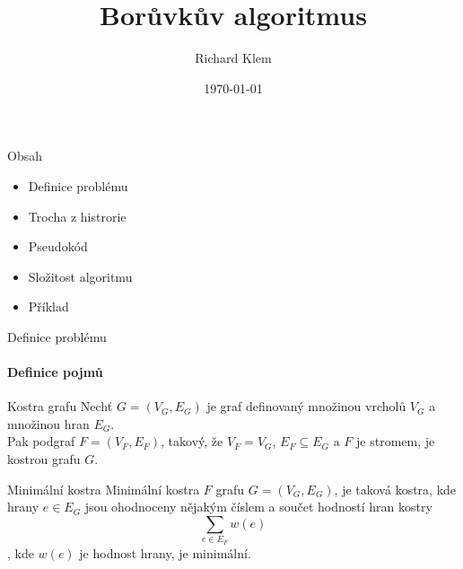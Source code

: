 \documentclass[hyperref={unicode}]{beamer}
\title{Borůvkův algoritmus}
\author{Richard Klem}
\date{\today}
\begin{document}
\maketitle
\begin{frame}{Obsah}
\begin{itemize}
\item Definice problému
\item Trocha z histrorie
\item Pseudokód
\item Složitost algoritmu
\item Příklad
\end{itemize}
\end{frame}
\begin{frame}{Definice problému}
\framesubtitle{Definice pojmů}
    \begin{block}{Kostra grafu}
    Nechť $G=(V_G,E_G)$ je graf definovaný množinou vrcholů $V_G$ a množinou hran $E_G$.\\
    Pak podgraf $F=(V_F,E_F)$, takový, že $V_F=V_G$, $E_F \subseteq E_G$ a $F$ je stromem, je kostrou grafu $G$.
    \end{block}
    \begin{block}{Minimální kostra}
    Minimální kostra $F$ grafu $G=(V_G,E_G)$, je taková kostra, kde hrany $e \in E_G$ jsou ohodnoceny nějakým číslem a součet hodností hran kostry $$\sum\limits_{e\in E_F}w(e)$$, kde $w(e)$ je hodnost hrany, je minimální.
    \end{block}
\end{frame}
\end{document}
